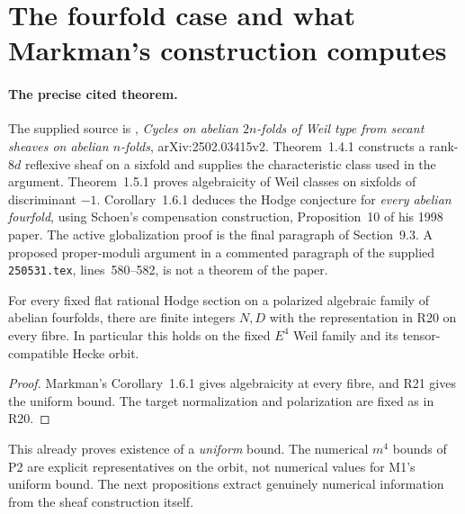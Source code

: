 \section{The fourfold case and what Markman's construction computes}\label{sec:markman}
\paragraph{The precise cited theorem.}
The supplied source is \citet{Markman25}, \emph{Cycles on abelian $2n$-folds of Weil type from secant sheaves on abelian $n$-folds}, arXiv:2502.03415v2. Theorem~1.4.1 constructs a rank-$8d$ reflexive sheaf on a sixfold and supplies the characteristic class used in the argument. Theorem~1.5.1 proves algebraicity of Weil classes on sixfolds of discriminant $-1$. Corollary~1.6.1 deduces the Hodge conjecture for \emph{every abelian fourfold}, using Schoen's compensation construction, Proposition~10 of his 1998 paper. The active globalization proof is the final paragraph of Section~9.3. A proposed proper-moduli argument in a commented paragraph of the supplied \texttt{250531.tex}, lines~580--582, is not a theorem of the paper.

\begin{corollary}\label{M1}
For every fixed flat rational Hodge section on a polarized algebraic family of abelian fourfolds, there are finite integers $N,D$ with the representation in R20 on every fibre. In particular this holds on the fixed $E^4$ Weil family and its tensor-compatible Hecke orbit.
\end{corollary}
\begin{proof}
Markman's Corollary~1.6.1 gives algebraicity at every fibre, and R21 gives the uniform bound. The target normalization and polarization are fixed as in R20.
\end{proof}

This already proves existence of a \emph{uniform} bound. The numerical $m^4$ bounds of P2 are explicit representatives on the orbit, not numerical values for M1's uniform bound. The next propositions extract genuinely numerical information from the sheaf construction itself.

